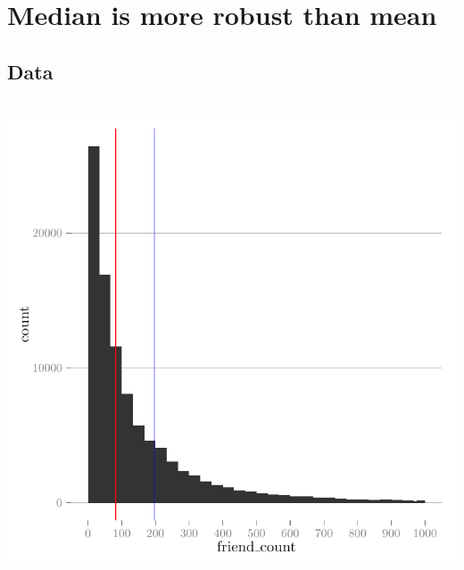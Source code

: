 \documentclass{article}
\begin{document}
\section{Median is more robust than mean}

\subsection{Data}

\begin{center}
  \inputminted{R}{data/data.R}
\end{center}

\includegraphics{figures/friends.pdf}
\end{document}
